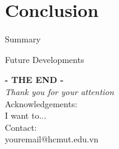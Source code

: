 \documentclass{article}
\begin{document}
\section{Conclusion}
\begin{frame}{Summary}

\end{frame}


\begin{frame}{Future Developments}

\end{frame}


\begin{frame}
    \centering
    \vspace{1cm}
    \textbf{\Huge{- THE END - }}\\
    \vspace{0.2cm}
    \textit{\Large{Thank you for your attention}}\\
    \vspace{15pt}
    Acknowledgements:\\
    I want to...\\
    \vspace{20pt}
    Contact:\\
    youremail@hcmut.edu.vn
\end{frame}

%         
%         
\end{document}
